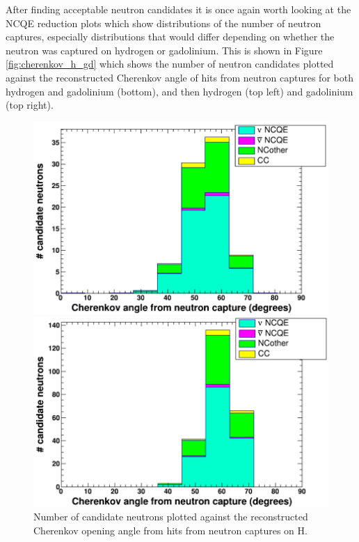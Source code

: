 After finding acceptable neutron candidates it is once again worth looking at the NCQE reduction plots which show distributions of the number of neutron captures, especially distributions that would differ depending on whether the neutron was captured on hydrogen or gadolinium. This is shown in Figure \ref{fig:cherenkov_h_gd} which shows the number of neutron candidates plotted against the reconstructed Cherenkov angle of hits from neutron captures for both hydrogen and gadolinium (bottom), and then hydrogen (top left) and gadolinium (top right).


\begin{figure}[htp]%
    \centering
    \begin{minipage}{0.49\textwidth}
    \includegraphics[width=\textwidth]{Figures/cherenkov_angle_neutron_capture_H.png}
    \caption{Number of candidate neutrons plotted against the reconstructed Cherenkov opening angle from hits from neutron captures on H.}
    \end{minipage}\hfill
    \begin{minipage}{0.49\textwidth}
    \includegraphics[width=\textwidth]{Figures/cherenkov_angle_neutron_capture_Gd.png}

\end{minipage}
\end{figure}
